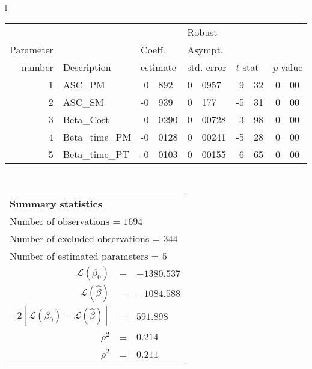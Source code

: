   \begin{tabular}{l}
\begin{tabular}{rlr@{.}lr@{.}lr@{.}lr@{.}l}
         &                       &   \multicolumn{2}{l}{}    & \multicolumn{2}{l}{Robust}  &     \multicolumn{4}{l}{}   \\
Parameter &                       &   \multicolumn{2}{l}{Coeff.}      & \multicolumn{2}{l}{Asympt.}  &     \multicolumn{4}{l}{}   \\
number &  Description                     &   \multicolumn{2}{l}{estimate}      & \multicolumn{2}{l}{std. error}  &   \multicolumn{2}{l}{$t$-stat}  &   \multicolumn{2}{l}{$p$-value}   \\

\hline

1 & ASC_PM  & 0&892 & 0&0957 & 9&32 & 0&00\\
2 & ASC_SM & -0&939 & 0&177 & -5&31 & 0&00\\
3 & Beta_Cost & 0&0290 & 0&00728 & 3&98 & 0&00\\
4 & Beta_time_PM & -0&0128 & 0&00241 & -5&28 & 0&00\\
5 & Beta_time_PT & -0&0103 & 0&00155 & -6&65 & 0&00\\
\hline
\end{tabular}
\\
\begin{tabular}{rcl}
\multicolumn{3}{l}{\bf Summary statistics}\\
\multicolumn{3}{l}{ Number of observations = $1694$} \\
\multicolumn{3}{l}{ Number of excluded observations = $344$} \\
\multicolumn{3}{l}{ Number of estimated  parameters = $5$} \\
 $\mathcal{L}(\beta_0)$ &=&  $-1380.537$ \\
 $\mathcal{L}(\hat{\beta})$ &=& $-1084.588 $  \\
 $-2[\mathcal{L}(\beta_0) -\mathcal{L}(\hat{\beta})]$ &=& $591.898$ \\
    $\rho^2$ &=&   $0.214$ \\
    $\bar{\rho}^2$ &=&    $0.211$ \\
\end{tabular}
  \end{tabular}
